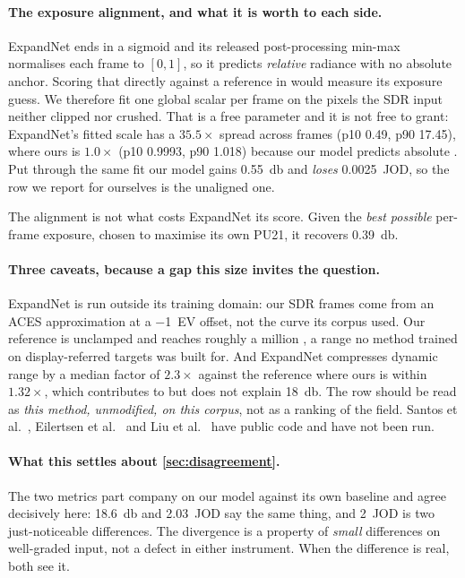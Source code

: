 \paragraph{The exposure alignment, and what it is worth to each side.}
ExpandNet ends in a sigmoid and its released post-processing min-max normalises
each frame to $[0,1]$, so it predicts \emph{relative} radiance with no absolute
anchor. Scoring that directly against a reference in \si{\nits} would measure its
exposure guess. We therefore fit one global scalar per frame on the pixels the
SDR input neither clipped nor crushed. That is a free parameter and it is not
free to grant: ExpandNet's fitted scale has a \textbf{$35.5\times$} spread across
frames (p10 \num{0.49}, p90 \num{17.45}), where ours is $1.0\times$ (p10
\num{0.9993}, p90 \num{1.018}) because our model predicts absolute
\si{\nits}. Put through the same fit our model gains \SI{0.55}{\decibel} and
\emph{loses} \num{0.0025}~JOD, so the row we report for ourselves is the
unaligned one.

The alignment is not what costs ExpandNet its score. Given the \emph{best
possible} per-frame exposure, chosen to maximise its own PU21, it recovers
\SI{+0.39}{\decibel}.

\paragraph{Three caveats, because a gap this size invites the question.}
ExpandNet is run outside its training domain: our SDR frames come from an ACES
approximation at a \SI{-1}{EV} offset, not the curve its corpus used. Our
reference is unclamped and reaches roughly a million \si{\nits}, a range no
method trained on display-referred targets was built for. And ExpandNet
compresses dynamic range by a median factor of $2.3\times$ against the reference
where ours is within $1.32\times$, which contributes to but does not explain
\SI{18}{\decibel}. The row should be read as \emph{this method, unmodified, on
this corpus}, not as a ranking of the field. Santos et
al.~\citep{santos2020}, Eilertsen et al.~\citep{eilertsen2017} and Liu et
al.~\citep{liu2020} have public code and have not been run.

\paragraph{What this settles about \cref{sec:disagreement}.}
The two metrics part company on our model against its own baseline and agree
decisively here: \SI{18.6}{\decibel} and \num{2.03}~JOD say the same thing, and
\num{2}~JOD is two just-noticeable differences. The divergence is a property of
\emph{small} differences on well-graded input, not a defect in either
instrument. When the difference is real, both see it.

